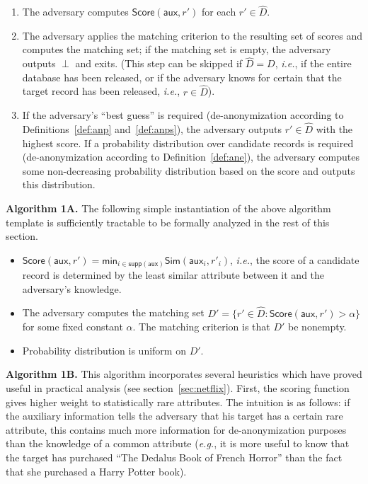 \documentclass[11pt]{article}
\newcommand{\ie}{\emph{i.e.}}
\newcommand{\eg}{\emph{e.g.}}
\newcommand{\Sim}{\textsf{Sim}}
\newcommand{\aux}{\textsf{aux}}
\newcommand{\minn}{\textsf{min}}
\newcommand{\supp}{\textsf{supp}}
\newcommand{\score}{\textsf{Score}}
\begin{document}
\begin{enumerate}

\item
The adversary computes $\score(\aux, r')$ for each $r' \in {\hat D}$.

\item
The adversary applies the matching criterion to the resulting set of
scores and computes the matching set; if the matching set is empty,
the adversary outputs $\perp$ and exits. (This step can be skipped if
${\hat D}=D$, \ie, if the entire database has been released, or if the
adversary knows for certain that the target record has been released,
\ie, $r \in {\hat D}$).

\item
If the adversary's ``best guess'' is required (de-anonymization according
to Definitions~\ref{def:anp} and~\ref{def:anps}), the adversary outputs
$r' \in {\hat D}$ with the highest score.  If a probability distribution
over candidate records is required (de-anonymization according to
Definition~\ref{def:ane}), the adversary computes some non-decreasing
probability distribution based on the score and outputs this distribution.

\end{enumerate}

\noindent
\textbf{Algorithm 1A.}
The following simple instantiation of the above algorithm template
is sufficiently tractable to be formally analyzed in the rest of this
section.

\begin{itemize}

\item
$\score(\aux, r') = \minn_{i \in \supp(\aux)} \Sim(\aux_i, r'_i)$,
\ie, the score of a candidate record is determined by the least similar
attribute between it and the adversary's knowledge.

\item
The adversary computes the matching set 
$D' = \{r' \in {\hat D} : \score(\aux, r') > \alpha\}$ 
for some fixed constant $\alpha$.
The matching criterion is that $D'$ be nonempty.

\item
Probability distribution is uniform on $D'$.

\end{itemize}

\vspace{1ex}
\noindent
\textbf{Algorithm 1B.}
This algorithm incorporates several heuristics which have proved useful
in practical analysis (see section~\ref{sec:netflix}).  First, the
scoring function gives higher weight to statistically rare attributes.
The intuition is as follows: if the auxiliary information tells the
adversary that his target has a certain rare attribute, this contains
much more information for de-anonymization purposes than the knowledge
of a common attribute (\eg, it is more useful to know that the target
has purchased ``The Dedalus Book of French Horror'' than the fact that
she purchased a Harry Potter book).
\end{document}
